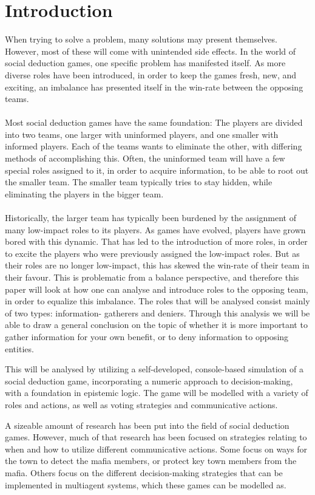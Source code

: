 \section{Introduction} \label{sec:introduction}
When trying to solve a problem, many solutions may present themselves. However,
most of these will come with unintended side effects. In the world of social
deduction games, one specific problem has manifested itself. As more diverse
roles have been introduced, in order to keep the games fresh, new, and
exciting, an imbalance has presented itself in the win-rate between the
opposing teams. \\ \\ Most social deduction games have the same foundation: The
players are divided into two teams, one larger with uninformed players, and one
smaller with informed players. Each of the teams wants to eliminate the other,
with differing methods of accomplishing this. Often, the uninformed team will
have a few special roles assigned to it, in order to acquire information, to be
able to root out the smaller team. The smaller team typically tries to stay
hidden, while eliminating the players in the bigger team.\\ \\ Historically,
the larger team has typically been burdened by the assignment of many
low-impact roles to its players. As games have evolved, players have grown
bored with this dynamic. That has led to the introduction of more roles, in
order to excite the players who were previously assigned the low-impact roles.
But as their roles are no longer low-impact, this has skewed the win-rate of
their team in their favour. This is problematic from a balance perspective, and
therefore this paper will look at how one can analyse and introduce roles to
the opposing team, in order to equalize this imbalance. The roles that will be
analysed consist mainly of two types: information- gatherers and deniers.
Through this analysis we will be able to draw a general conclusion on the topic
of whether it is more important to gather information for your own benefit, or
to deny information to opposing entities.

This will be analysed by utilizing a self-developed, console-based simulation
of a social deduction game, incorporating a numeric approach to
decision-making, with a foundation in epistemic logic. The game will be
modelled with a variety of roles and actions, as well as voting strategies and
communicative actions.

A sizeable amount of research has been put into the field of social deduction
games. However, much of that research has been focused on strategies relating
to when and how to utilize different communicative actions\cite{commitment}.
Some focus on ways for the town to detect the mafia
members\cite{werewolf_stealth}, or protect key town members from the
mafia\cite{werewolf_nash_equilibrium}. Others focus on the different
decision-making strategies that can be implemented in multiagent systems, which
these games can be modelled
as\cite{modelling_multi_agent_epistemic_systems}\cite{multi_agent_epistemic_planner_common_knowledge}\cite{probibalistic_multiagent_systems}.

